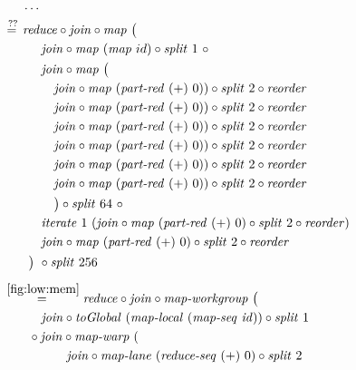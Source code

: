 \begin{figure*}[t]
\begin{align*}
  &\hspace{.5em}\ldots\\
%
  &\hspace{-2em}\quad\begin{aligned}
    &\overset{??}{=\hspace{.2em}}
      \reduce \circ \join \circ \map\ \big(\\
    &\qquad\quad\join \circ \map\ (\map\ id) \circ \splitN\ 1\ \circ\\
    &\qquad\quad\join \circ \map\ \big(\\
    &\qquad\qquad \join \circ \map\ (\partRed\ (+)\ 0))\circ \splitN\ 2 \circ \reorder\\
    &\qquad\qquad \join \circ \map\ (\partRed\ (+)\ 0))\circ \splitN\ 2 \circ \reorder\\
    &\qquad\qquad \join \circ \map\ (\partRed\ (+)\ 0))\circ \splitN\ 2 \circ \reorder\\
    &\qquad\qquad \join \circ \map\ (\partRed\ (+)\ 0))\circ \splitN\ 2 \circ \reorder\\
    &\qquad\qquad \join \circ \map\ (\partRed\ (+)\ 0))\circ \splitN\ 2 \circ \reorder\\
    &\qquad\qquad \join \circ \map\ (\partRed\ (+)\ 0))\circ \splitN\ 2 \circ \reorder\\
    &\qquad\qquad\big)\circ \splitN\ 64\ \circ\\
    &\qquad\quad\iterateN\ 1\ (\join \circ \map\ (\partRed\ (+)\ 0) \circ \splitN\ 2\circ \reorder)\\
    &\qquad\quad\join \circ \map\ (\partRed\ (+)\ 0) \circ \splitN\ 2\circ \reorder\\
    &\qquad\big)\ \circ \splitN\ 256
  \end{aligned}\\[.5em]
%
  &\hspace{-2em}\quad\begin{aligned}
    &\overset{\ref{fig:low:mem}}{=\hspace{.2em}}
      \reduce \circ \join \circ \mapWorkgroup\ \big(\\
    &\qquad\quad \join \circ \toGlobal\ (\mapLocal\ (\mapSeq\ \id)) \circ \splitN\ 1\\
    &\qquad \circ \join \circ \mapWarp\ (\\
    &\qquad\qquad\ \ \ \join \circ \mapLane\ (\reduceSeq\ (+)\ 0) \circ \splitN\ 2\\

\end{aligned}
\end{align*}
\end{figure*}
